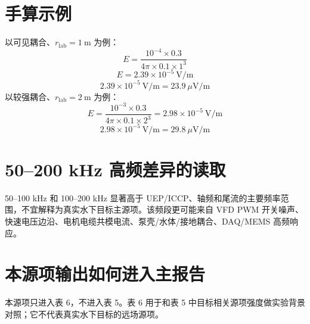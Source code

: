 \documentclass[UTF8,a4paper,11pt]{ctexart}
\begin{document}
\section{手算示例}
以可见耦合、$r_{\mathrm{lab}}=1\ \mathrm{m}$ 为例：
\[
E=\frac{10^{-4}\times0.3}{4\pi\times0.1\times1^3}
\]
\[
E=2.39\times10^{-5}\ \mathrm{V/m}
\]
\[
2.39\times10^{-5}\ \mathrm{V/m}=23.9\ \mu\mathrm{V/m}
\]
以较强耦合、$r_{\mathrm{lab}}=2\ \mathrm{m}$ 为例：
\[
E=\frac{10^{-3}\times0.3}{4\pi\times0.1\times2^3}
=2.98\times10^{-5}\ \mathrm{V/m}
\]
\[
2.98\times10^{-5}\ \mathrm{V/m}=29.8\ \mu\mathrm{V/m}
\]

\section{50--200 kHz 高频差异的读取}
50--100 kHz 和 100--200 kHz 显著高于 UEP/ICCP、轴频和尾流的主要频率范围，不宜解释为真实水下目标主源项。该频段更可能来自 VFD PWM 开关噪声、快速电压边沿、电机电缆共模电流、泵壳/水体/接地耦合、DAQ/MEMS 高频响应。

\section{本源项输出如何进入主报告}
本源项只进入表 6，不进入表 5。表 6 用于和表 5 中目标相关源项强度做实验背景对照；它不代表真实水下目标的远场源项。
\end{document}
